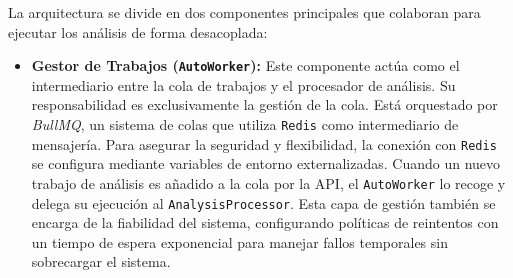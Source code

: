La arquitectura se divide en dos componentes principales que colaboran para ejecutar los análisis de forma desacoplada:

\begin{itemize}
\item \textbf{Gestor de Trabajos (\texttt{AutoWorker}):} Este componente actúa como el intermediario entre la cola de trabajos y el procesador de análisis. Su responsabilidad es exclusivamente la gestión de la cola. Está orquestado por \textit{BullMQ}, un sistema de colas que utiliza \texttt{Redis} como intermediario de mensajería. Para asegurar la seguridad y flexibilidad, la conexión con \texttt{Redis} se configura mediante variables de entorno externalizadas. Cuando un nuevo trabajo de análisis es añadido a la cola por la API, el \texttt{AutoWorker} lo recoge y delega su ejecución al \texttt{AnalysisProcessor}. Esta capa de gestión también se encarga de la fiabilidad del sistema, configurando políticas de reintentos con un tiempo de espera exponencial para manejar fallos temporales sin sobrecargar el sistema.


\end{itemize}
